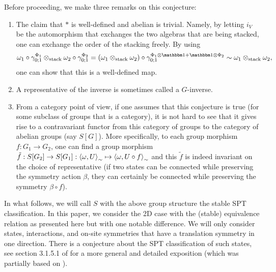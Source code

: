\documentclass[11pt,a4paper,twoside]{article}
\numberwithin{equation}{section}
\begin{document}
	Before proceeding, we make three remarks on this conjecture:
	\begin{enumerate}
		\item The claim that $*$ is well-defined and abelian is trivial. Namely, by letting $i_V$ be the automorphism that exchanges the two algebras that are being stacked, one can exchange the order of the stacking freely. By using
		\begin{equation}
			\omega_1\circ\gamma^{\Phi_1}_{0;1}\otimes_\text{stack}\omega_2\circ\gamma^{\Phi_2}_{0;1}=(\omega_1\otimes_{\text{stack}}\omega_2)\circ\gamma^{\Phi_1\otimes\id+\id\otimes\Phi_2}_{0;1}\sim\omega_1\otimes_{\text{stack}}\omega_2,
		\end{equation}
		one can show that this is a well-defined map.
		\item A representative of the inverse is sometimes called a $G$-inverse.
		\item From a category point of view, if one assumes that this conjecture is true (for some subclass of groups that is a category), it is not hard to see that it gives rise to a contravariant functor from this category of groups to the category of abelian groups (say $S[G]$). More specifically, to each group morphism $f:G_1\rightarrow G_2$, one can find a group morphism $\tilde{f}:S[G_2]\rightarrow S[G_1]:\expval{\omega,U}_\sim\mapsto \expval{\omega,U\circ f}_\sim$ and this $\tilde{f}$ is indeed invariant on the choice of representative (if two states can be connected while preserving the symmetry action $\beta$, they can certainly be connected while preserving the symmetry $\beta\circ f$).
	\end{enumerate}
	In what follows, we will call $S$ with the above group structure the stable SPT classification. In this paper, we consider the 2D case with the (stable) equivalence relation as presented here but with one notable difference. We will only consider states, interactions, and on-site symmetries that have a translation symmetry in one direction. There is a conjecture about the SPT classification of such states, see section 3.1.5.1 of \cite{xiong2019classification} for a more general and detailed exposition (which was partially based on \cite{Chen_2013}).
\end{document}
